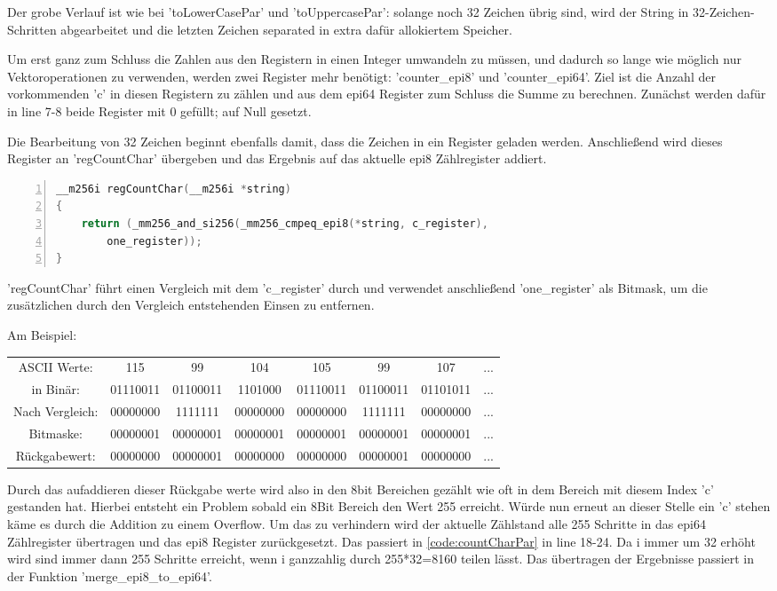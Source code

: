 \documentclass[plainarticle,zihtitle,german,final,hyperref,utf8]{zihpub}
\begin{document}
Der grobe Verlauf ist wie bei 'toLowerCasePar' und 'toUppercasePar': solange noch 32 Zeichen übrig sind, wird der String in 32-Zeichen-Schritten abgearbeitet und die letzten Zeichen separated in extra dafür allokiertem Speicher.

Um erst ganz zum Schluss die Zahlen aus den Registern in einen Integer umwandeln zu müssen, und dadurch so lange wie möglich nur Vektoroperationen zu verwenden, werden zwei Register mehr benötigt: 'counter\_epi8' und 'counter\_epi64'. Ziel ist die Anzahl der vorkommenden 'c' in diesen Registern zu zählen und aus dem epi64 Register zum Schluss die Summe zu berechnen.
Zunächst werden dafür in line 7-8 beide Register mit 0 gefüllt; auf Null gesetzt.

Die Bearbeitung von 32 Zeichen beginnt ebenfalls damit, dass die Zeichen in ein Register geladen werden. Anschließend wird dieses Register an 'regCountChar' übergeben und das Ergebnis auf das aktuelle epi8 Zählregister addiert.

\begin{lstlisting}[language=c, numbers=left]
__m256i regCountChar(__m256i *string)
{
	return (_mm256_and_si256(_mm256_cmpeq_epi8(*string, c_register),
		one_register));
}
\end{lstlisting}

'regCountChar' führt einen Vergleich mit dem 'c\_register' durch und verwendet anschließend 'one\_register' als Bitmask, um die zusätzlichen durch den Vergleich entstehenden Einsen zu entfernen.

Am Beispiel:\newline
\begin{tabular}{cccccccc}
	ASCII Werte: &115 &99 &104 &105 &99 &107 & ...\\
	in Binär: &01110011 &01100011 &1101000 &01110011 &01100011 &01101011 & ...\\
	Nach Vergleich: &00000000 &1111111 &00000000 &00000000 &1111111 &00000000 & ...\\
	Bitmaske: &00000001 &00000001 &00000001 &00000001 &00000001 &00000001 & ...\\
	Rückgabewert: &00000000 &00000001 &00000000 &00000000 &00000001 &00000000  & ... \\
\end{tabular}
\newline
Durch das aufaddieren dieser Rückgabe werte wird also in den 8bit Bereichen gezählt wie oft in dem Bereich mit diesem Index 'c' gestanden hat.
Hierbei entsteht ein Problem sobald ein 8Bit Bereich den Wert 255 erreicht. Würde nun erneut an dieser Stelle ein 'c' stehen käme es durch die Addition zu einem Overflow. Um das zu verhindern wird der aktuelle Zählstand alle 255 Schritte in das epi64 Zählregister übertragen und das epi8 Register zurückgesetzt. Das passiert in \ref{code:countCharPar} in line 18-24. Da i immer um 32 erhöht wird sind immer dann 255 Schritte erreicht, wenn i ganzzahlig durch 255*32=8160 teilen lässt.
Das übertragen der Ergebnisse passiert in der Funktion 'merge\_epi8\_to\_epi64'.
\end{document}
